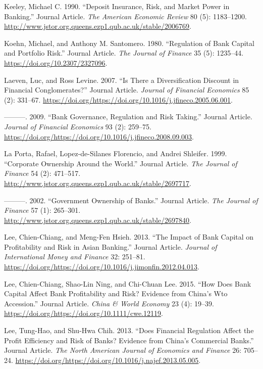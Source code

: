 \documentclass{article}
\begin{document}
\leavevmode\hypertarget{ref-RN56}{}%
Keeley, Michael C. 1990. ``Deposit Insurance, Risk, and Market Power in
Banking.'' Journal Article. \emph{The American Economic Review} 80 (5):
1183--1200.
\url{http://www.jstor.org.queens.ezp1.qub.ac.uk/stable/2006769}.

\leavevmode\hypertarget{ref-RN57}{}%
Koehn, Michael, and Anthony M. Santomero. 1980. ``Regulation of Bank
Capital and Portfolio Risk.'' Journal Article. \emph{The Journal of
Finance} 35 (5): 1235--44. \url{https://doi.org/10.2307/2327096}.

\leavevmode\hypertarget{ref-RN60}{}%
Laeven, Luc, and Ross Levine. 2007. ``Is There a Diversification
Discount in Financial Conglomerates?'' Journal Article. \emph{Journal of
Financial Economics} 85 (2): 331--67.
\url{https://doi.org/https://doi.org/10.1016/j.jfineco.2005.06.001}.

\leavevmode\hypertarget{ref-RN1}{}%
---------. 2009. ``Bank Governance, Regulation and Risk Taking.''
Journal Article. \emph{Journal of Financial Economics} 93 (2): 259--75.
\url{https://doi.org/https://doi.org/10.1016/j.jfineco.2008.09.003}.

\leavevmode\hypertarget{ref-RN58}{}%
La Porta, Rafael, Lopez-de-Silanes Florencio, and Andrei Shleifer. 1999.
``Corporate Ownership Around the World.'' Journal Article. \emph{The
Journal of Finance} 54 (2): 471--517.
\url{http://www.jstor.org.queens.ezp1.qub.ac.uk/stable/2697717}.

\leavevmode\hypertarget{ref-RN59}{}%
---------. 2002. ``Government Ownership of Banks.'' Journal Article.
\emph{The Journal of Finance} 57 (1): 265--301.
\url{http://www.jstor.org.queens.ezp1.qub.ac.uk/stable/2697840}.

\leavevmode\hypertarget{ref-RN61}{}%
Lee, Chien-Chiang, and Meng-Fen Hsieh. 2013. ``The Impact of Bank
Capital on Profitability and Risk in Asian Banking.'' Journal Article.
\emph{Journal of International Money and Finance} 32: 251--81.
\url{https://doi.org/https://doi.org/10.1016/j.jimonfin.2012.04.013}.

\leavevmode\hypertarget{ref-RN62}{}%
Lee, Chien-Chiang, Shao-Lin Ning, and Chi-Chuan Lee. 2015. ``How Does
Bank Capital Affect Bank Profitability and Risk? Evidence from China's
Wto Accession.'' Journal Article. \emph{China \& World Economy} 23 (4):
19--39. \url{https://doi.org/https://doi.org/10.1111/cwe.12119}.

\leavevmode\hypertarget{ref-RN63}{}%
Lee, Tung-Hao, and Shu-Hwa Chih. 2013. ``Does Financial Regulation
Affect the Profit Efficiency and Risk of Banks? Evidence from China's
Commercial Banks.'' Journal Article. \emph{The North American Journal of
Economics and Finance} 26: 705--24.
\url{https://doi.org/https://doi.org/10.1016/j.najef.2013.05.005}.
\end{document}
